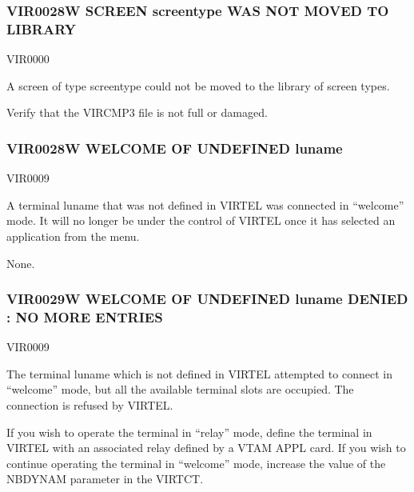 \documentclass[letterpaper,10pt,english]{sphinxmanual}
\begin{document}
\subsubsection{VIR0028W SCREEN screentype WAS NOT MOVED TO LIBRARY}
\label{\detokenize{messages:vir0028w-screen-screentype-was-not-moved-to-library}}\begin{description}
\sphinxAtStartPar
VIR0000

\sphinxAtStartPar
A screen of type screentype could not be moved to the library of screen types.

\sphinxAtStartPar
Verify that the VIRCMP3 file is not full or damaged.

\end{description}


\subsubsection{VIR0028W WELCOME OF UNDEFINED luname}
\label{\detokenize{messages:vir0028w-welcome-of-undefined-luname}}\begin{description}
\sphinxAtStartPar
VIR0009

\sphinxAtStartPar
A terminal luname that was not defined in VIRTEL was connected in “welcome” mode. It will no longer be under the control of VIRTEL once it has selected an application from the menu.

\sphinxAtStartPar
None.

\end{description}


\subsubsection{VIR0029W WELCOME OF UNDEFINED luname DENIED : NO MORE ENTRIES}
\label{\detokenize{messages:vir0029w-welcome-of-undefined-luname-denied-no-more-entries}}\begin{description}
\sphinxAtStartPar
VIR0009

\sphinxAtStartPar
The terminal luname which is not defined in VIRTEL attempted to connect in “welcome” mode, but all the available terminal slots are occupied. The connection is refused by VIRTEL.

\sphinxAtStartPar
If you wish to operate the terminal in “relay” mode, define the terminal in VIRTEL with an associated relay defined by a VTAM APPL card. If you wish to continue operating the terminal in “welcome” mode, increase the value of the NBDYNAM parameter in the VIRTCT.

\end{description}
\end{document}
